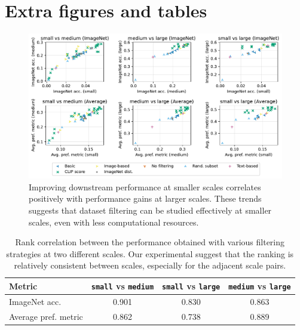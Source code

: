 \clearpage

\section{Extra figures and tables}
\label{sec:app-more-plots}

\begin{figure}[h]
    \centering
    \includegraphics[width=\textwidth]{figures/scaling_scatter.pdf}
    \caption{Improving downstream performance at smaller scales correlates positively with performance gains at larger scales. These trends suggests that dataset filtering can be studied effectively at smaller scales, even with less computational resources.}
    \label{fig:scaling-scatter-full}
\end{figure}




\begin{table}
\caption{Rank correlation between the performance obtained with various filtering strategies at two different scales. Our experimental suggest that the ranking is relatively consistent between scales, especially for the adjacent scale pairs.}
\setlength\tabcolsep{6pt}
\renewcommand{\arraystretch}{1.1}
\footnotesize
\centering
\begin{tabular}{lccc}
\toprule
Metric   & {\small \texttt{small}} vs  {\small \texttt{medium}} & {\small \texttt{small}} vs {\small \texttt{large}} & {\small \texttt{medium}} vs {\small \texttt{large}} \\
\midrule
ImageNet acc. & 0.901 & 0.830 & 0.863 \\
Average pref. metric & 0.862 & 0.738 & 0.889 \\
\bottomrule
\end{tabular}
\label{tab:correlation}
\end{table}

